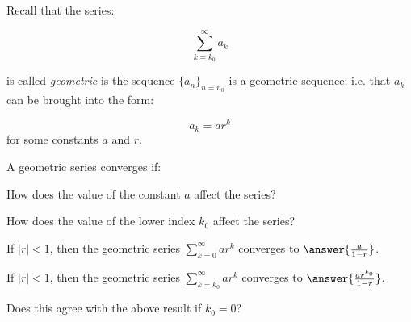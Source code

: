 \documentclass{ximera}
\author{Jim Talamo}
\begin{document}
\begin{exercise}
Recall that the series:

\[
\sum_{k=k_0}^{\infty} a_k
\]

is called \emph{geometric} is the sequence $\{a_n\}_{n=n_0}$ is a geometric sequence; i.e. that  $a_k$ can be brought into the form:

\[
a_k = ar^k
\]
for some constants $a$ and $r$.

\begin{exercise}
A geometric series converges if:
\begin{multipleChoice}
\end{multipleChoice}

\end{exercise}
How does the value of the constant $a$ affect the series?
\begin{multipleChoice}
\end{multipleChoice}

How does the value of the lower index $k_0$ affect the series?
\begin{multipleChoice}
\end{multipleChoice}

\begin{exercise}
If $|r|<1$, then the geometric series $\sum_{k=0}^{\infty} ar^k$ converges to $\answer{\frac{a}{1-r}}$.

\begin{exercise}
If $|r|<1$, then the geometric series $\sum_{k=k_0}^{\infty} ar^k$ converges to $\answer{\frac{ar^{k_0}}{1-r}}$.

Does this agree with the above result if $k_0=0$?

\begin{multipleChoice}
\end{multipleChoice}
\end{exercise}
\end{exercise}


\end{exercise}
\end{document}
